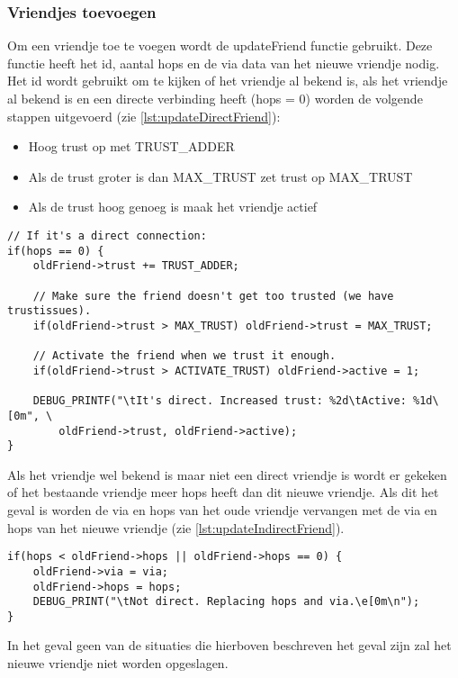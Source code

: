     \subsubsection{Vriendjes toevoegen}
        Om een vriendje toe te voegen wordt de updateFriend functie gebruikt. Deze functie heeft het id, aantal hops en de via data van het nieuwe vriendje nodig. Het id wordt gebruikt om te kijken of het vriendje al bekend is, als het vriendje al bekend is en een directe verbinding heeft (hops = 0) worden de volgende stappen uitgevoerd (zie \autoref{lst:updateDirectFriend}):
        \begin{itemize}
            \item Hoog trust op met TRUST\_ADDER
            \item Als de trust groter is dan MAX\_TRUST zet trust op MAX\_TRUST
            \item Als de trust hoog genoeg is maak het vriendje actief
        \end{itemize}
\begin{lstlisting}[caption={Update direct vriendje},captionpos=b,label={lst:updateDirectFriend},style=c,xleftmargin=.\textwidth,xrightmargin=.\textwidth]
// If it's a direct connection:
if(hops == 0) {
    oldFriend->trust += TRUST_ADDER;

    // Make sure the friend doesn't get too trusted (we have trustissues).
    if(oldFriend->trust > MAX_TRUST) oldFriend->trust = MAX_TRUST;

    // Activate the friend when we trust it enough.
    if(oldFriend->trust > ACTIVATE_TRUST) oldFriend->active = 1;

    DEBUG_PRINTF("\tIt's direct. Increased trust: %2d\tActive: %1d\[0m", \ 
        oldFriend->trust, oldFriend->active);
}
\end{lstlisting}
        Als het vriendje wel bekend is maar niet een direct vriendje is wordt er gekeken of het bestaande vriendje meer hops heeft dan dit nieuwe vriendje. Als dit het geval is worden de via en hops van het oude vriendje vervangen met de via en hops van het nieuwe vriendje (zie \autoref{lst:updateIndirectFriend}). 
\begin{lstlisting}[caption={Update indirect vriendje},captionpos=b,label={lst:updateIndirectFriend},style=c,xleftmargin=.\textwidth,xrightmargin=.\textwidth]
if(hops < oldFriend->hops || oldFriend->hops == 0) {
    oldFriend->via = via;
    oldFriend->hops = hops;
    DEBUG_PRINT("\tNot direct. Replacing hops and via.\e[0m\n");
}
\end{lstlisting}
        In het geval geen van de situaties die hierboven beschreven het geval zijn zal het nieuwe vriendje niet worden opgeslagen.

